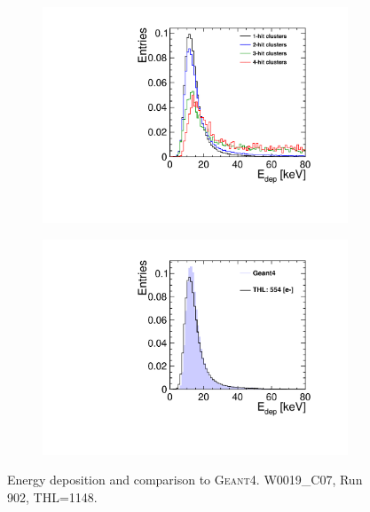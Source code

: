 \begin{figure}[htbp] \centering
  \begin{subfigure}[b]{0.45\textwidth}
    \includegraphics[width=\textwidth]{./figures/Calibration/Edep_Clusters_W0019_C07.pdf}
    \caption{}
  \end{subfigure}\hfill
  \begin{subfigure}[b]{0.45\textwidth}
    \includegraphics[width=\textwidth]{./figures/Calibration/Edep_G4_W0019_C07.pdf}
    \caption{}
  \end{subfigure}
  \caption{Energy deposition and comparison to
    \textsc{Geant4}. W0019\_C07, Run 902, THL=1148.}
  \label{fig:EdepW19C7}
\end{figure}


